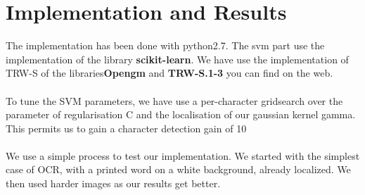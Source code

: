 \documentclass[10pt]{article}
\begin{document}
\section{Implementation and Results}

The implementation has been done with python2.7. The svm part use the implementation of the library \textbf{scikit-learn}. We have use the implementation of TRW-S of the libraries\textbf{Opengm} and \textbf{TRW-S.1-3} you can find on the web.
\\\\
To tune the SVM parameters, we have use a per-character gridsearch over the parameter of regularisation C and the localisation of our gaussian kernel gamma. This permits us to gain a character detection gain of 10%
\\\\
We use a simple process to test our implementation. We started with the simplest case of OCR, with a printed word on a white background, already localized. We then used harder images as our results get better.
\end{document}
